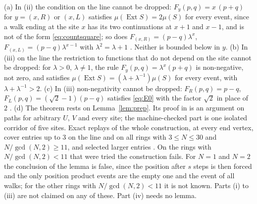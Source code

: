 \begin{remark}\label{rem:posprodlimits}
(a) In (ii) the condition on the line cannot be dropped: $F_y(p,q)=x\,(p+q)$ for $y=(x,R)$ or $(x,L)$ satisfies $\mu(\operatorname{Ext}S)=2\mu(S)$ for every event, since a walk ending at the site $x$ has its two continuations at $x+1$ and $x-1$, and is not of the form \eqref{eq:countsquare}; so does $F_{(x,R)}=(p-q)\lambda^x$, $F_{(x,L)}=(p-q)\lambda^{x-1}$ with $\lambda^2=\lambda+1$ \cite{comp4s}. Neither is bounded below in $y$.
(b) In (iii) on the line the restriction to functions that do not depend on the site cannot be dropped: for $\lambda>0$, $\lambda\ne1$, the rule $F_y(p,q)=\lambda^x(p+q)$ is non-negative, not zero, and satisfies $\mu(\operatorname{Ext}S)=(\lambda+\lambda^{-1})\mu(S)$ for every event, with $\lambda+\lambda^{-1}>2$.
(c) In (iii) non-negativity cannot be dropped: $F_R(p,q)=p-q$, $F_L(p,q)=(\sqrt2-1)(p-q)$ satisfies \eqref{eq:E0} with the factor $\sqrt2$ in place of $2$ \cite{comp4s}.
(d) The theorem rests on Lemma~\ref{lem:prep}. Its proof in \cite{dgmask} is an argument on paths for arbitrary $U$, $V$ and every site; the machine-checked part is one isolated corridor of five sites. Exact replays of the whole construction, at every end vertex, cover entries up to $3$ on the line and on all rings with $3\le N\le30$ and $N/\gcd(N,2)\ge11$, and selected larger entries \cite{dgmask,comp4s}. On the rings with $N/\gcd(N,2)<11$ that were tried the construction fails. For $N=1$ and $N=2$ the conclusion of the lemma is false, since the position after $s$ steps is then forced and the only position product events are the empty one and the event of all walks; for the other rings with $N/\gcd(N,2)<11$ it is not known. Parts (i) to (iii) are not claimed on any of these. Part (iv) needs no lemma.
\end{remark}

